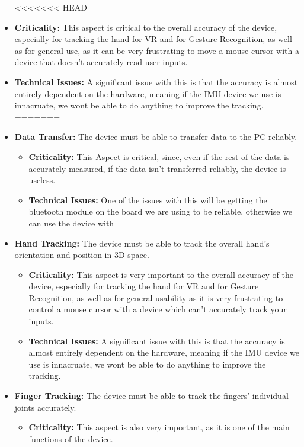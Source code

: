\documentclass[12pt,a4paper,oneside]{book}
\theoremstyle{plain}
\numberwithin{equation}{chapter}
\begin{document}
\begin{itemize}
<<<<<<< HEAD
    \item \textbf{Criticality:} This aspect is critical to the overall accuracy of the device, especially for tracking the hand for VR and for Gesture Recognition, as well as for general use, as it can be very frustrating to move a mouse cursor with a device that doesn't accurately read user inputs.
    \item \textbf{Technical Issues:} A significant issue with this is that the accuracy is almost entirely dependent on the hardware, meaning if the IMU device we use is innacruate, we wont be able to do anything to improve the tracking.
=======
    \item \textbf{Data Transfer:} The device must be able to transfer data to the PC reliably.
        \begin{itemize}
            \item \textbf{Criticality:} This Aspect is critical, since, even if the rest of the data is accurately measured, if the data isn't transferred reliably, the device is useless.
            \item \textbf{Technical Issues:} One of the issues with this will be getting the bluetooth module on the board we are using to be reliable, otherwise we can use the device with
        \end{itemize}
    \item \textbf{Hand Tracking:} The device must be able to track the overall hand's orientation and position in 3D space.
        \begin{itemize}
            \item \textbf{Criticality:} This aspect is very important to the overall accuracy of the device, especially for tracking the hand for VR and for Gesture Recognition, as well as for general usability as it is very frustrating to control a mouse cursor with a device which can't accurately track your inputs.
            \item \textbf{Technical Issues:} A significant issue with this is that the accuracy is almost entirely dependent on the hardware, meaning if the IMU device we use is innacruate, we wont be able to do anything to improve the tracking.
        \end{itemize}
    \item \textbf{Finger Tracking:} The device must be able to track the fingers' individual joints accurately.
        \begin{itemize}
            \item \textbf{Criticality:} This aspect is also very important, as it is one of the main functions of the device.

\end{itemize}
\end{itemize}
\end{document}
